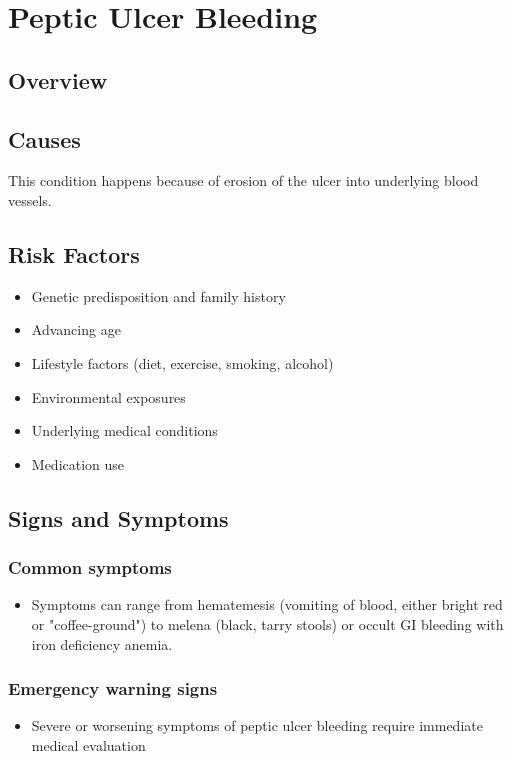 \chapter{Peptic Ulcer Bleeding}
\label{sec:Peptic Ulcer Bleeding}

\section{Overview}

\section{Causes}
This condition happens because of erosion of the ulcer into underlying blood vessels.     
\section{Risk Factors}

\begin{itemize}[noitemsep]
  \item Genetic predisposition and family history
  \item Advancing age
  \item Lifestyle factors (diet, exercise, smoking, alcohol)
  \item Environmental exposures
  \item Underlying medical conditions
  \item Medication use
\end{itemize}
\section{Signs and Symptoms}

\subsection{Common symptoms}
\begin{itemize}[noitemsep]
  \item Symptoms can range from hematemesis (vomiting of blood, either bright red or "coffee-ground") to melena (black, tarry stools) or occult GI bleeding with iron deficiency anemia. 
  \end{itemize}

\subsection{Emergency warning signs}
\begin{itemize}[noitemsep]
  \item Severe or worsening symptoms of peptic ulcer bleeding require immediate medical evaluation
\end{itemize}

